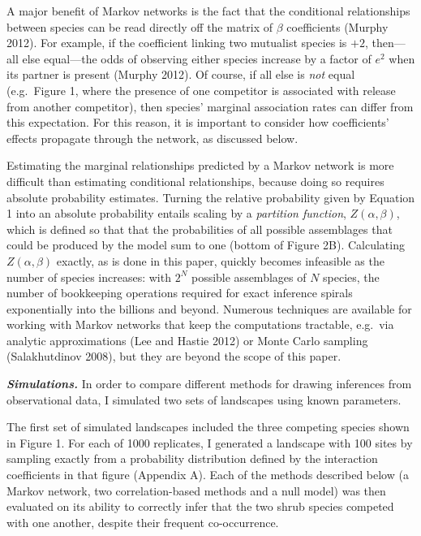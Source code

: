 \documentclass[12pt,]{article}
\begin{document}
\begin{spacing}{1.9}
\begin{flushleft}
A major benefit of Markov networks is the fact that the conditional
relationships between species can be read directly off the matrix of
\(\beta\) coefficients (Murphy 2012). For example, if the coefficient
linking two mutualist species is \(+2\), then---all else equal---the
odds of observing either species increase by a factor of \(e^2\) when
its partner is present (Murphy 2012). Of course, if all else is
\emph{not} equal (e.g.~Figure 1, where the presence of one competitor is
associated with release from another competitor), then species' marginal
association rates can differ from this expectation. For this reason, it
is important to consider how coefficients' effects propagate through the
network, as discussed below.

Estimating the marginal relationships predicted by a Markov network is
more difficult than estimating conditional relationships, because doing
so requires absolute probability estimates. Turning the relative
probability given by Equation 1 into an absolute probability entails
scaling by a \emph{partition function}, \(Z(\alpha, \beta)\), which is
defined so that that the probabilities of all possible assemblages that
could be produced by the model sum to one (bottom of Figure 2B).
Calculating \(Z(\alpha, \beta)\) exactly, as is done in this paper,
quickly becomes infeasible as the number of species increases: with
\(2^N\) possible assemblages of \(N\) species, the number of bookkeeping
operations required for exact inference spirals exponentially into the
billions and beyond. Numerous techniques are available for working with
Markov networks that keep the computations tractable, e.g.~via analytic
approximations (Lee and Hastie 2012) or Monte Carlo sampling
(Salakhutdinov 2008), but they are beyond the scope of this paper.

\textbf{\emph{Simulations.}} In order to compare different methods for
drawing inferences from observational data, I simulated two sets of
landscapes using known parameters.

The first set of simulated landscapes included the three competing
species shown in Figure 1. For each of 1000 replicates, I generated a
landscape with 100 sites by sampling exactly from a probability
distribution defined by the interaction coefficients in that figure
(Appendix A). Each of the methods described below (a Markov network, two
correlation-based methods and a null model) was then evaluated on its
ability to correctly infer that the two shrub species competed with one
another, despite their frequent co-occurrence.


\end{flushleft}
\end{spacing}
\end{document}
